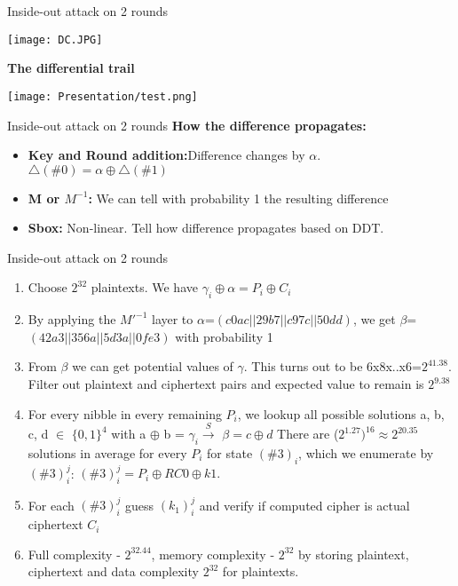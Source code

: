 \begin{frame}{Inside-out attack on 2 rounds }  
\begin{center}
\texttt{[image: DC.JPG]}
\end{center}
\textbf{The differential trail}
\begin{center}
\texttt{[image: Presentation/test.png]}
\end{center}

\end{frame}
\begin{frame}{Inside-out attack on 2 rounds}
\textbf{How the difference propagates:}
\begin{itemize}
    \item \textbf{Key and Round addition:}Difference changes by $\alpha$. $\triangle (\#0)=\alpha\oplus\triangle (\#1)$
    \item \textbf{M or $M^{-1}$:} We can tell with probability 1 the resulting difference
    \item \textbf{Sbox:} Non-linear. Tell how difference propagates based on DDT.
\end{itemize}
    
\end{frame}
\begin{frame}{Inside-out attack on 2 rounds}
\begin{enumerate}
    \item Choose $2^{32}$ plaintexts. We have $\gamma_i\oplus\alpha=P_i\oplus C_i$
    \item By applying the $M'^{−1}$ layer to $\alpha$=$(c0ac || 29b7 || c97c || 50dd)$, we get $\beta$= $(42a3 || 356a || 5d3a || 0fe3)$ with probability 1
    \item From $\beta$ we can get potential values of $\gamma$. This turns out to be 6x8x..x6=$2^{41.38}$.
    Filter out plaintext and ciphertext pairs and expected value to remain is $2^{9.38}$
    \item For every nibble in every remaining $P_i$, we lookup all possible solutions a, b, c, d $\in$ $\{0, 1\}^4$ with a $\oplus$ b = $\gamma_i \xrightarrow{S}$  $\beta = c \oplus d$ There are ($2^{1.27})^ {16} \approx 2^{20.35}$ solutions in average for every $P_i$ for state $(\#3)_i$, which we enumerate by $(\#3)^j_i$: $(\#3)^j_i = P_i \oplus RC0 \oplus k1.$
    \item For each $(\#3)^j_i$ guess $(k_1)^j_i$ and verify if computed cipher is actual ciphertext $C_i$
    \item Full complexity - $2^{32.44}$, memory complexity - $2^{32}$ by storing plaintext, ciphertext and data complexity $2^{32}$ for plaintexts.
\end{enumerate}
    
\end{frame}
